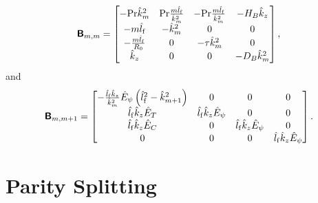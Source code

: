 \documentclass{article}
\newcommand{\khat}{\hat{k}}
\newcommand{\lhatf}{\hat{l}_{\rm f}}
\newcommand{\Prd}{\mathrm{Pr}}
\newcommand{\Rz}{R_{0}}
\newcommand{\HB}{H_{B}}
\newcommand{\DB}{D_{B}}
\newcommand{\EhatT}{\hat{E}_{T}}
\newcommand{\EhatC}{\hat{E}_{C}}
\newcommand{\Ehatp}{\hat{E}_{\psi}}
\newcommand{\Bmat}{\boldsymbol{\mathsf{B}}}
\begin{document}
%
\begin{equation}
  \Bmat_{m,m} =
  \begin{bmatrix}
    -\Prd \khat^2_m &
    \Prd \frac{m \lhatf}{\khat^2_m} &
    -\Prd \frac{m \lhatf}{\khat^2_m} &
    -\HB \khat_z \\
    - m \lhatf &
    -\khat^2_m &
    0 &
    0 \\
    - \frac{m \lhatf}{\Rz} &
    0 &
    - \tau \khat^2_m &
    0 \\
    \khat_z &
    0 &
    0 &
    - \DB \khat^2_m
  \end{bmatrix},
\end{equation}
%
and
%
\begin{equation}
  \Bmat_{m,m+1} =
  \begin{bmatrix}
    -\frac{\lhatf \khat_z}{\khat^2_m} \Ehatp \left( \lhatf^2 - \khat^2_{m+1} \right) &
    0 &
    0 &
    0 \\
    \lhatf \khat_z \EhatT &
    \lhatf \khat_z \Ehatp &
    0 &
    0 \\
    \lhatf \khat_z \EhatC &
    0 &
    \lhatf \khat_z \Ehatp &
    0 \\
    0 &
    0 &
    0 &
    \lhatf \khat_z \Ehatp
  \end{bmatrix}.
\end{equation}
%

\section{Parity Splitting}
\end{document}
